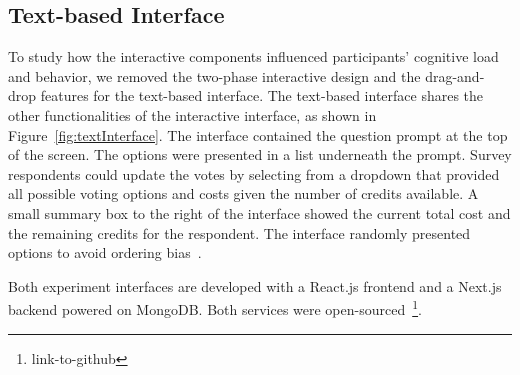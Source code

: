 \subsection{Text-based Interface}To study how the interactive components influenced participants' cognitive load and behavior, we removed the two-phase interactive design and the drag-and-drop features for the text-based interface. The text-based interface shares the other functionalities of the interactive interface, as shown in Figure~\ref{fig:textInterface}. The interface contained the question prompt at the top of the screen. The options were presented in a list underneath the prompt. Survey respondents could update the votes by selecting from a dropdown that provided all possible voting options and costs given the number of credits available. A small summary box to the right of the interface showed the current total cost and the remaining credits for the respondent. The interface randomly presented options to avoid ordering bias~\cite{ferberOrderBiasMail1952, couperWebSurveyDesign2001}.

Both experiment interfaces are developed with a React.js frontend and a Next.js backend powered on MongoDB. Both services were open-sourced~\footnote{link-to-github}.







